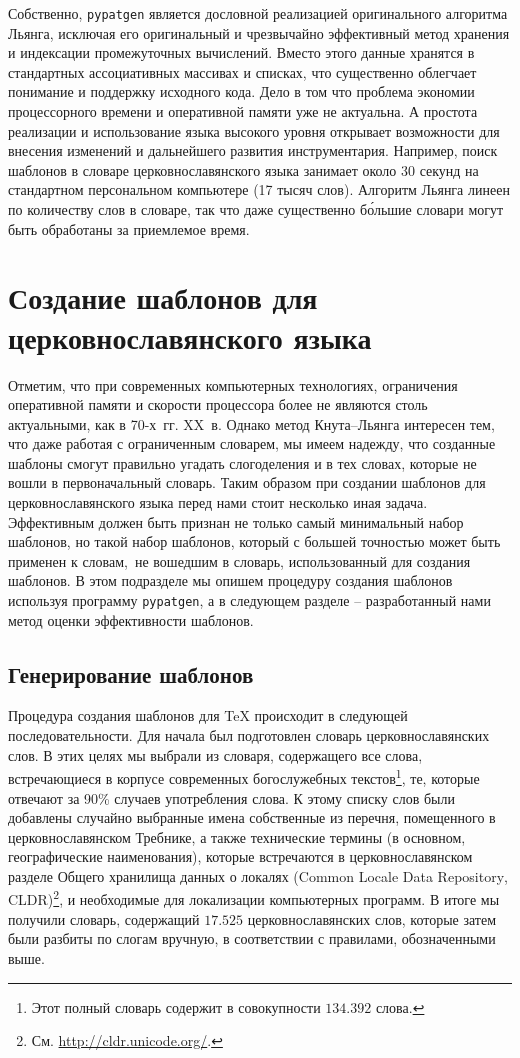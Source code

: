 \documentclass[12pt,a4paper,oneside]{extarticle}
\begin{document}
Собственно, \verb+pypatgen+ является дословной реализацией оригинального алгоритма Льянга, исключая его оригинальный и чрезвычайно эффективный метод хранения и индексации промежуточных вычислений. Вместо этого данные хранятся в стандартных ассоциативных массивах и списках, что существенно облегчает понимание и поддержку исходного кода. Дело в том что проблема экономии процессорного времени и оперативной памяти уже не актуальна. А простота реализации и использование языка высокого уровня открывает возможности для внесения изменений и дальнейшего развития инструментария. Например, поиск шаблонов в словаре церковнославянского языка занимает около 30 секунд на стандартном персональном компьютере (17 тысяч слов). Алгоритм Льянга линеен по количеству слов в словаре, так что даже существенно б\'ольшие словари могут быть обработаны за приемлемое время.

\section{Создание шаблонов для церковнославянского языка}

Отметим, что при современных компьютерных технологиях, ограничения оперативной памяти и скорости процессора более не являются столь актуальными, как в 70-х~гг. XX~в. Однако метод Кнута--Льянга интересен тем, что даже работая с ограниченным словарем, мы имеем надежду, что созданные шаблоны смогут правильно угадать слогоделения и в тех словах, которые не вошли в первоначальный словарь. Таким образом при создании шаблонов для церковнославянского языка перед нами стоит несколько иная задача. Эффективным должен быть признан не только самый минимальный набор шаблонов, но такой набор шаблонов, который с большей точностью может быть применен к словам, не вошедшим в словарь, использованный для создания шаблонов. В этом подразделе мы опишем процедуру создания шаблонов используя программу \verb+pypatgen+, а в следующем разделе -- разработанный нами метод оценки эффективности шаблонов.

\subsection{Генерирование шаблонов}

Процедура создания шаблонов для \TeX{} происходит в следующей последовательности. Для начала был подготовлен словарь церковнославянских слов. В этих целях мы выбрали из словаря, содержащего все слова, встречающиеся в корпусе современных богослужебных текстов\footnote{Этот полный словарь содержит в совокупности $134.392$ слова.}, те, которые отвечают за 90\% случаев употребления слова. К этому списку слов были добавлены случайно выбранные имена собственные из перечня, помещенного в церковнославянском Требнике, а также технические термины (в основном, географические наименования), которые встречаются в церковнославянском разделе Общего хранилища данных о локалях (\textenglish{Common Locale Data Repository}, CLDR)\footnote{См. \url{http://cldr.unicode.org/}.}, и необходимые для локализации компьютерных программ. В итоге мы получили словарь, содержащий $17.525$ церковнославянских слов, которые затем были разбиты по слогам вручную, в соответствии с правилами, обозначенными выше.
\end{document}
